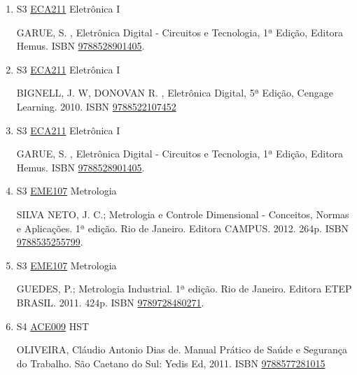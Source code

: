 \documentclass[12pt,a4paper]{book}
\begin{document}
\begin{enumerate}
 BIGNELL, J.  W, DONOVAN R. , Eletrônica Digital, 5ª Edição, Cengage Learning.  2010.   ISBN \href{http://www.bn.br/site/pages/servicosProfissionais/agenciaISBN/isbnBusca/FbnBuscaISBNCatalogo.asp?pField=ISBN&pIntPagina=1&pISBN=22107452&nidbISBN=true&hidbISBN=true}{9788522107452}
 
 
 \item S3 \hyperref[PUD:ECA211]{ECA211} Eletrônica I

 GARUE, S. , Eletrônica Digital - Circuitos e Tecnologia, 1ª Edição, Editora Hemus.  ISBN \href{http://www.bn.br/site/pages/servicosProfissionais/agenciaISBN/isbnBusca/FbnBuscaISBNCatalogo.asp?pField=ISBN&pIntPagina=1&pISBN=28901405&nidbISBN=true&hidbISBN=true}{9788528901405}.
 \item S3 \hyperref[PUD:ECA211]{ECA211} Eletrônica I

 BIGNELL, J.  W, DONOVAN R. , Eletrônica Digital, 5ª Edição, Cengage Learning.  2010.   ISBN \href{http://www.bn.br/site/pages/servicosProfissionais/agenciaISBN/isbnBusca/FbnBuscaISBNCatalogo.asp?pField=ISBN&pIntPagina=1&pISBN=22107452&nidbISBN=true&hidbISBN=true}{9788522107452}
 
 
 \item S3 \hyperref[PUD:ECA211]{ECA211} Eletrônica I

 GARUE, S. , Eletrônica Digital - Circuitos e Tecnologia, 1ª Edição, Editora Hemus.  ISBN \href{http://www.bn.br/site/pages/servicosProfissionais/agenciaISBN/isbnBusca/FbnBuscaISBNCatalogo.asp?pField=ISBN&pIntPagina=1&pISBN=28901405&nidbISBN=true&hidbISBN=true}{9788528901405}.
 \item S3 \hyperref[PUD:EME107]{EME107} Metrologia

 SILVA NETO, J.  C.;  Metrologia e Controle Dimensional - Conceitos, Normas e Aplicações.  1ª edição.  Rio de Janeiro.  Editora CAMPUS.  2012.  264p.  ISBN \href{http://www.bn.br/site/pages/servicosProfissionais/agenciaISBN/isbnBusca/FbnBuscaISBNCatalogo.asp?pField=ISBN&pIntPagina=1&pISBN=35255799&nidbISBN=true&hidbISBN=true}{9788535255799}. 
 
 
 \item S3 \hyperref[PUD:EME107]{EME107} Metrologia

 GUEDES, P.;  Metrologia Industrial.  1ª edição.  Rio de Janeiro.  Editora ETEP BRASIL.  2011.  424p.  ISBN \href{http://www.google.com/search?hl=pt-BR&tbo=p&tbm=bks&q=isbn:9789728480271&num=10}{9789728480271}.
 \item S4 \hyperref[PUD:ACE009]{ACE009} HST

  OLIVEIRA, Cláudio Antonio Dias de.  Manual Prático de Saúde e Segurança do Trabalho.  São Caetano do Sul: Yedis Ed, 2011.  ISBN \href{http://www.bn.br/site/pages/servicosProfissionais/agenciaISBN/isbnBusca/FbnBuscaISBNCatalogo.asp?pField=ISBN&pIntPagina=1&pISBN=77281015&nidbISBN=true&hidbISBN=true}{9788577281015}
 

\end{enumerate}
\end{document}
